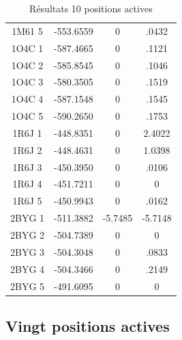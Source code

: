 \documentclass[a4paper,12pt]{article}
\begin{document}
\begin{table}[h]
\begin{tabular}{|c|c|c|c|}
        1M61 5 & -553.6559 & 0 & .0432 \\
        1O4C 1 & -587.4665 & 0 & .1121 \\
        1O4C 2 & -585.8545 & 0 & .1046 \\
        1O4C 3 & -580.3505 & 0 & .1519 \\
        1O4C 4 & -587.1548 & 0 & .1545 \\
        1O4C 5 & -590.2650 & 0 & .1753 \\
        1R6J 1 & -448.8351 & 0 & 2.4022 \\
        1R6J 2 & -448.4631 & 0 & 1.0398 \\
        1R6J 3 & -450.3950 & 0 & .0106 \\
        1R6J 4 & -451.7211 & 0 & 0 \\
        1R6J 5 & -450.9943 & 0 & .0162 \\
        2BYG 1 & -511.3882 & -5.7485 & -5.7148 \\
        2BYG 2 & -504.7389 & 0 & 0 \\
        2BYG 3 & -504.3048 & 0 & .0833 \\
        2BYG 4 & -504.3466 & 0 & .2149 \\
        2BYG 5 & -491.6095 & 0 & 0 \\

        \hline


 \end{tabular}      
 \caption{Résultats 10 positions actives }
 \label{tab_echec2BYG__1}      
\end{table}


   \subsection{ Vingt positions actives}
\end{document}

